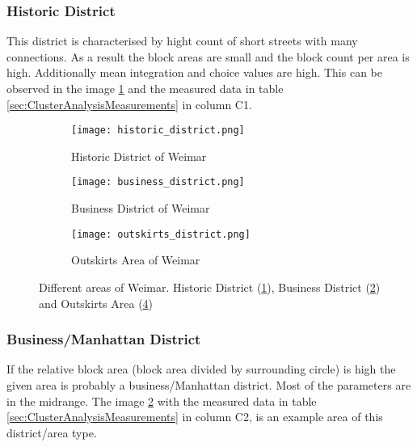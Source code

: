 \subsubsection{Historic District}
\label{sec:historyDistinct}
This district is characterised by hight count of short streets with many connections. As a result the block areas are small and the block count per area is high. Additionally mean integration and choice values are high. This can be observed in the image \ref{fig:historic_district} and the measured data in table \ref{sec:ClusterAnalysisMeasurements} in column C1.

\begin{figure}
    \centering
    \begin{subfigure}[b]{0.6\textwidth}
        \begin{mdframed}[style=mdthight]
            \texttt{[image: historic\_district.png]}
        \end{mdframed}
        \caption{Historic District of Weimar}
        \label{fig:historic_district}
    \end{subfigure}
    \par\medskip
    \begin{subfigure}[b]{0.6\textwidth}
        \begin{mdframed}[style=mdthight]
            \texttt{[image: business\_district.png]}
        \end{mdframed}
        \caption{Business District of Weimar}
        \label{fig:business_district}
    \end{subfigure}
    \begin{subfigure}[b]{0.6\textwidth}
        \begin{mdframed}[style=mdthight]
            \texttt{[image: outskirts\_district.png]}
        \end{mdframed}
        \caption{Outskirts Area of Weimar}
        \label{fig:outskirts_district}
    \end{subfigure}
    \caption{Different areas of Weimar. Historic District (\ref{fig:historic_district}), Business District (\ref{fig:business_district}) and Outskirts Area (\ref{fig:outskirts_district})}
\end{figure}

\subsubsection{Business/Manhattan District}
\label{sec:businessDistinct}
If the relative block area (block area divided by surrounding circle) is high the given area is probably a business/Manhattan district. Most of the parameters are in the midrange. The image \ref{fig:business_district} with the measured data in table \ref{sec:ClusterAnalysisMeasurements} in column C2, is an example area of this district/area type.

